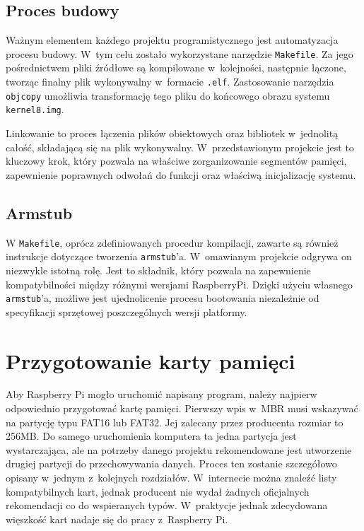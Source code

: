 \documentclass[shortabstract]{iithesis}
\begin{document}
\subsection{Proces budowy}
Ważnym elementem każdego projektu programistycznego jest automatyzacja procesu budowy. W~tym celu zostało wykorzystane narzędzie \texttt{Makefile}. Za jego pośrednictwem pliki źródłowe są kompilowane w~kolejności, następnie łączone, tworząc finalny plik wykonywalny w~formacie \texttt{.elf}. Zastosowanie narzędzia \texttt{objcopy} umożliwia transformację tego pliku do końcowego obrazu systemu \texttt{kernel8.img}.

Linkowanie to proces łączenia plików obiektowych oraz bibliotek w~jednolitą całość, składającą się na plik wykonywalny. W~przedstawionym projekcie jest to kluczowy krok, który pozwala na właściwe zorganizowanie segmentów pamięci, zapewnienie poprawnych odwołań do funkcji oraz właściwą inicjalizację systemu.
\subsection{Armstub}
W \texttt{Makefile}, oprócz zdefiniowanych procedur kompilacji, zawarte są również instrukcje dotyczące tworzenia \texttt{armstub}'a. W~omawianym projekcie odgrywa on niezwykle istotną rolę. Jest to składnik, który pozwala na zapewnienie kompatybilności między różnymi wersjami RaspberryPi. Dzięki użyciu własnego \texttt{armstub}'a, możliwe jest ujednolicenie procesu bootowania niezależnie od specyfikacji sprzętowej poszczególnych wersji platformy.

\section{Przygotowanie karty pamięci}
Aby Raspberry Pi mogło uruchomić napisany program, należy najpierw odpowiednio przygotować kartę pamięci. Pierwszy wpis w~MBR musi wskazywać na partycję typu FAT16 lub FAT32. Jej zalecany przez producenta rozmiar to 256MB. Do samego uruchomienia komputera ta jedna partycja jest wystarczająca, ale na potrzeby danego projektu rekomendowane jest utworzenie drugiej partycji do przechowywania danych. Proces ten zostanie szczegółowo opisany w~jednym z~kolejnych rozdziałów. W~internecie można znaleźć listy kompatybilnych kart, jednak producent nie wydał żadnych oficjalnych rekomendacji co do wspieranych typów. W~praktycje jednak zdecydowana więszkość kart nadaje się do pracy z~Raspberry Pi.
\end{document}
